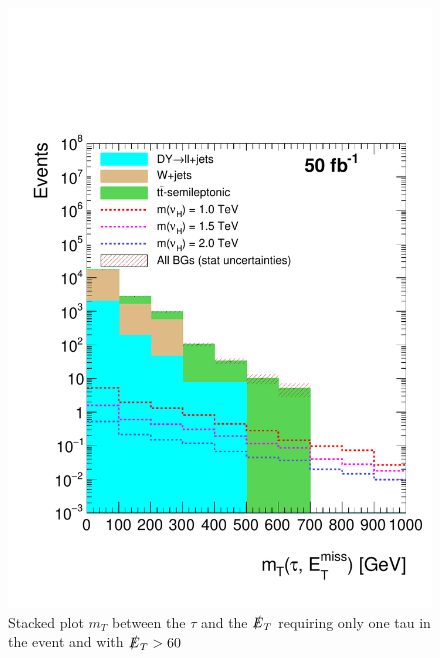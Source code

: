 \begin{figure}[H]
\centering
\includegraphics[width=\linewidth]{StackPlots/mT_1Tau_met60_50ifb.pdf}
\caption{Stacked plot $m_{T}$ between the $\tau$ and the $\slashed{E}_{T}$ requiring only one tau in the event and with $\slashed{E}_{T} > 60$}
\label{fig: mT1tauMet60}
\end{figure}










